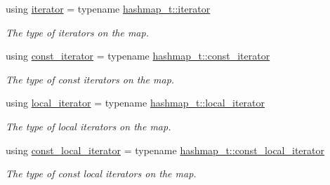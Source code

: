 \begin{DoxyCompactItemize}
using \hyperlink{group__Types_gab52d604c26835c20a0363f9affa7ff57}{iterator} = typename \hyperlink{classshad_1_1Hashmap_a2500b369fd011d6a9d5e98ff213c9c66}{hashmap\-\_\-t\-::iterator}
\begin{DoxyCompactList}\small\item\em The type of iterators on the map. \end{DoxyCompactList}\item 
using \hyperlink{group__Types_ga102c3cd521767bf4b22f3788ccc054e8}{const\-\_\-iterator} = typename \hyperlink{classshad_1_1Hashmap_a1f8a379c42bc2d4b67dcc9f519dc537e}{hashmap\-\_\-t\-::const\-\_\-iterator}
\begin{DoxyCompactList}\small\item\em The type of const iterators on the map. \end{DoxyCompactList}\item 
using \hyperlink{group__Types_ga520d395c30b2b19179153108ea694cec}{local\-\_\-iterator} = typename \hyperlink{classshad_1_1Hashmap_a64f114b7ab44339efad138ec0c72b052}{hashmap\-\_\-t\-::local\-\_\-iterator}
\begin{DoxyCompactList}\small\item\em The type of local iterators on the map. \end{DoxyCompactList}\item 
using \hyperlink{group__Types_ga2242fb2071462a5f8a420d8cd8a7d8e8}{const\-\_\-local\-\_\-iterator} = typename \hyperlink{classshad_1_1Hashmap_afdf2dad495223a7d8bcec4256b591d89}{hashmap\-\_\-t\-::const\-\_\-local\-\_\-iterator}
\begin{DoxyCompactList}\small\item\em The type of const local iterators on the map. \end{DoxyCompactList}\end{DoxyCompactItemize}
